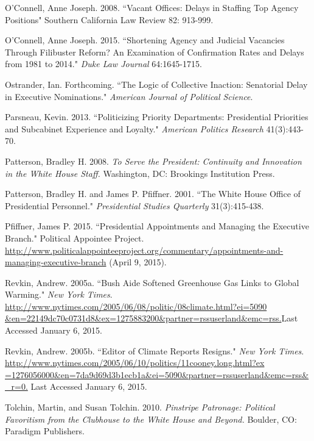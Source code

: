 \documentclass[12pt]{article}
\begin{document}
\noindent \hangindent=0.7cm O'Connell, Anne Joseph. 2008. ``Vacant Offices: Delays in Staffing Top Agency Positions" Southern California Law Review 82: 913-999.

\noindent \hangindent=0.7cm O'Connell, Anne Joseph. 2015. ``Shortening Agency and Judicial Vacancies Through Filibuster Reform? An Examination of Confirmation Rates and Delays from 1981 to 2014." \textit{Duke Law Journal} 64:1645-1715.

\noindent \hangindent=0.7cm Ostrander, Ian. Forthcoming. ``The Logic of Collective Inaction: Senatorial Delay in Executive Nominations." \textit{American Journal of Political Science}.

\noindent \hangindent=0.7cm Parsneau, Kevin. 2013. ``Politicizing Priority Departments: Presidential Priorities and Subcabinet Experience and Loyalty." \textit{American Politics Research} 41(3):443-70.

\noindent \hangindent=0.7cm Patterson, Bradley H. 2008. \textit{To Serve the President: Continuity and Innovation in the White House Staff.} Washington, DC: Brookings Institution Press.

\noindent \hangindent=0.7cm Patterson, Bradley H. and James P. Pfiffner. 2001. ``The White House Office of Presidential Personnel." \textit{Presidential Studies Quarterly} 31(3):415-438.

\noindent \hangindent=0.7cm Pfiffner, James P. 2015. ``Presidential Appointments and Managing the Executive Branch." Political Appointee Project. \url{http://www.politicalappointeeproject.org/commentary/appointments-and-managing-executive-branch} (April 9, 2015).

\noindent \hangindent=0.7cm Revkin, Andrew. 2005a. ``Bush Aide Softened Greenhouse Gas Links to Global Warming." \textit{New York Times}. \url{http://www.nytimes.com/2005/06/08/politic/08climate.html?ei=5090 &en=22149dc70c0731d8&ex=1275883200&partner=rssuserland&emc=rss.}Last Accessed January 6, 2015.

\noindent \hangindent=0.7cm Revkin, Andrew. 2005b. ``Editor of Climate Reports Resigns." \textit{New York Times}. \url{http://www.nytimes.com/2005/06/10/politics/11cooney.long.html?ex =1276056000&en=7da9d69d3b1ecb1a&ei=5090&partner=rssuserland&emc=rss&_r=0.} Last Accessed January 6, 2015. 

\noindent \hangindent=0.7cm Tolchin, Martin, and Susan Tolchin. 2010. \textit{Pinstripe Patronage: Political Favoritism from the Clubhouse to the White House and Beyond.} Boulder, CO: Paradigm Publishers.
\end{document}
